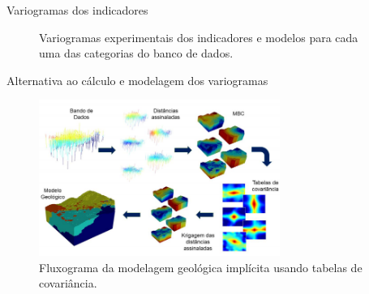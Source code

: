 \documentclass[aspectratio=169]{beamer}
\begin{document}
\begin{frame}{Variogramas dos indicadores}
	\begin{figure}[H] 
		\caption{Variogramas experimentais dos indicadores e modelos para cada uma das categorias do banco de dados.} \label{ind_var}
		\centering
	\end{figure}
\end{frame}

\begin{frame}{Alternativa ao cálculo e modelagem dos variogramas}
	\begin{figure}[H]
		\caption{\label{cov_table}Fluxograma da modelagem geológica implícita usando tabelas de covariância.}
		\begin{center}
			\includegraphics[width=0.7\textwidth]{capitulo_2/cov_table.png}
		\end{center}
	\end{figure}
\end{frame}
\end{document}
